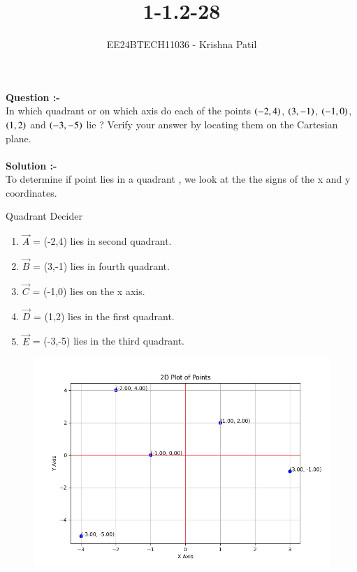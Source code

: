 \documentclass[journal]{IEEEtran}
\begin{document}

\vspace{3cm}

\title{1-1.2-28}
\author{EE24BTECH11036 - Krishna Patil}
{\let\newpage\relax\maketitle}

\renewcommand{\thefigure}{\theenumi}
\renewcommand{\thetable}{\theenumi}
\setlength{\intextsep}{10pt} %


\renewcommand{\thetable}{\theenumi}

\textbf { Question :- } \\
 In which quadrant or on which axis do each of the points {$ \left(-2,4 \right)$}, {$ \left(3,-1\right) $}, {$ \left(-1,0\right) $}, {$ \left(1,2\right) $} and {$ \left(-3,-5\right) $} lie ? Verify your answer by locating them on the Cartesian plane. \\ \\
\textbf { Solution :- } \\
To determine if point lies in a quadrant , we look at the the signs of the x and y coordinates.
\begin{table}[h!]    
  \centering
  
  \caption{Quadrant Decider}
  \label{tab1-1.2-28}
\end{table}
\begin{enumerate}
\item {$ \vec A $} = (-2,4) lies in second quadrant.
\item {$ \vec B $} = (3,-1)  lies in fourth quadrant.
\item {$ \vec C $} = (-1,0) lies on the x axis.
\item {$ \vec D $} = (1,2) lies in the first quadrant.
\item {$ \vec E $} = (-3,-5) lies in the third quadrant.
\end {enumerate} 
\begin{figure}[h!]
   \centering
   \includegraphics[width=0.6\linewidth]{figures/Figure_1.png}
   \label{x-yplot}
\end{figure}
\end{document}
